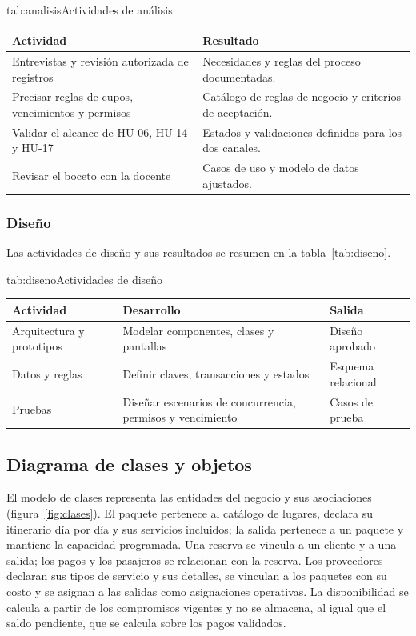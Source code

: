 \begin{tablaapa}{tab:analisis}{Actividades de análisis}
\small
\begin{tabular}{@{}p{7.2cm}p{7.2cm}@{}}
\toprule
Actividad & Resultado \\
\midrule
Entrevistas y revisión autorizada de registros & Necesidades y reglas del
proceso documentadas. \\
Precisar reglas de cupos, vencimientos y permisos & Catálogo de reglas de
negocio y criterios de aceptación. \\
Validar el alcance de HU-06, HU-14 y HU-17 & Estados y validaciones definidos
para los dos canales. \\
Revisar el boceto con la docente & Casos de uso y modelo de datos
ajustados. \\
\bottomrule
\end{tabular}
\end{tablaapa}

\subsubsection{Diseño} Las actividades de diseño y sus resultados se resumen
en la tabla~\ref{tab:diseno}.

\begin{tablaapa}{tab:diseno}{Actividades de diseño}
\small
\begin{tabular}{@{}p{5.2cm}p{4.6cm}p{4.6cm}@{}}
\toprule
Actividad & Desarrollo & Salida \\
\midrule
Arquitectura y prototipos & Modelar componentes, clases y pantallas & Diseño
aprobado \\
Datos y reglas & Definir claves, transacciones y estados & Esquema
relacional \\
Pruebas & Diseñar escenarios de concurrencia, permisos y vencimiento &
Casos de prueba \\
\bottomrule
\end{tabular}
\end{tablaapa}

\subsection{Diagrama de clases y objetos}

El modelo de clases representa las entidades del negocio y sus asociaciones
(figura~\ref{fig:clases}). El paquete pertenece al catálogo de lugares,
declara su itinerario día por día y sus servicios incluidos; la salida
pertenece a un paquete y mantiene la capacidad programada. Una reserva se
vincula a un cliente y a una salida; los pagos y los pasajeros se relacionan
con la reserva. Los proveedores declaran sus tipos de servicio y sus
detalles, se vinculan a los paquetes con su costo y se asignan a las salidas
como asignaciones operativas. La disponibilidad se calcula a partir de los
compromisos vigentes y no se almacena, al igual que el saldo pendiente, que
se calcula sobre los pagos validados.

